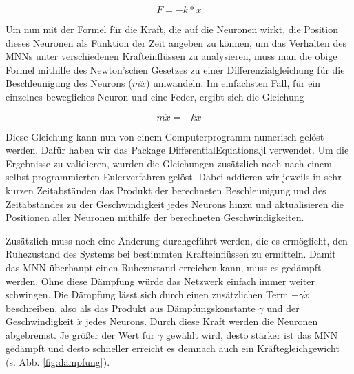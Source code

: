 {\[
    F = -k *  x
\]}

Um nun mit der Formel für die Kraft, die auf die Neuronen wirkt, die Position dieses Neuronen als Funktion der Zeit angeben zu können, um das Verhalten des MNNs unter verschiedenen Krafteinflüssen zu analysieren, muss man die obige Formel 
mithilfe des Newton'schen Gesetzes
zu einer Differenzialgleichung für die Beschleunigung des Neurons ($m \ddot x $) umwandeln.
Im einfachsten Fall, für ein einzelnes bewegliches Neuron und eine Feder, ergibt sich die Gleichung 

{\[
m \ddot{x} = -k x
\]}


Diese Gleichung kann nun von einem Computerprogramm numerisch gelöst werden. Dafür haben wir das Package DifferentialEquations.jl verwendet.
Um die Ergebnisse zu validieren, wurden die Gleichungen zusätzlich noch nach einem selbst programmierten Eulerverfahren gelöst.
Dabei addieren wir jeweils in sehr kurzen Zeitabständen das Produkt der berechneten Beschleunigung und des Zeitabstandes zu der Geschwindigkeit jedes Neurons hinzu und aktualisieren die Positionen aller Neuronen mithilfe der berechneten Geschwindigkeiten.

Zusätzlich muss noch eine Änderung durchgeführt werden, die es ermöglicht, den Ruhezustand des Systems bei bestimmten Krafteinflüssen zu ermitteln.
Damit das MNN überhaupt einen Ruhezustand erreichen kann, muss es gedämpft werden.
Ohne diese Dämpfung würde das Netzwerk einfach immer weiter schwingen. 
Die Dämpfung lässt sich durch einen zusätzlichen Term $-\gamma \dot{x}$ beschreiben, also als das Produkt aus 
Dämpfungskonstante $\gamma$ und der
Geschwindigkeit $\dot{x}$ jedes Neurons.
Durch diese Kraft werden die Neuronen abgebremst.
Je größer der Wert für $\gamma$ gewählt wird, desto stärker ist das MNN gedämpft und desto schneller erreicht es demnach auch ein Kräftegleichgewicht (s. Abb. \ref{fig:dämpfung}).

